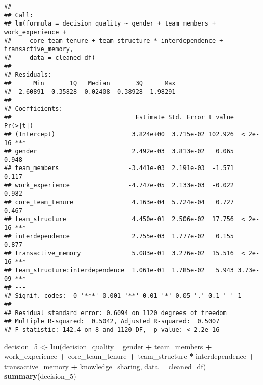 \documentclass[]{article}
\newenvironment{Shaded}{\begin{snugshade}}{\end{snugshade}}
\newcommand{\DataTypeTok}[1]{\textcolor[rgb]{0.13,0.29,0.53}{#1}}
\newcommand{\DecValTok}[1]{\textcolor[rgb]{0.00,0.00,0.81}{#1}}
\newcommand{\KeywordTok}[1]{\textcolor[rgb]{0.13,0.29,0.53}{\textbf{#1}}}
\newcommand{\NormalTok}[1]{#1}
\newcommand{\OperatorTok}[1]{\textcolor[rgb]{0.81,0.36,0.00}{\textbf{#1}}}
\newcommand{\StringTok}[1]{\textcolor[rgb]{0.31,0.60,0.02}{#1}}
\begin{document}
\begin{verbatim}
## 
## Call:
## lm(formula = decision_quality ~ gender + team_members + work_experience + 
##     core_team_tenure + team_structure * interdependence + transactive_memory, 
##     data = cleaned_df)
## 
## Residuals:
##      Min       1Q   Median       3Q      Max 
## -2.60891 -0.35828  0.02408  0.38928  1.98291 
## 
## Coefficients:
##                                  Estimate Std. Error t value Pr(>|t|)    
## (Intercept)                     3.824e+00  3.715e-02 102.926  < 2e-16 ***
## gender                          2.492e-03  3.813e-02   0.065    0.948    
## team_members                   -3.441e-03  2.191e-03  -1.571    0.117    
## work_experience                -4.747e-05  2.133e-03  -0.022    0.982    
## core_team_tenure                4.163e-04  5.724e-04   0.727    0.467    
## team_structure                  4.450e-01  2.506e-02  17.756  < 2e-16 ***
## interdependence                 2.755e-03  1.777e-02   0.155    0.877    
## transactive_memory              5.083e-01  3.276e-02  15.516  < 2e-16 ***
## team_structure:interdependence  1.061e-01  1.785e-02   5.943 3.73e-09 ***
## ---
## Signif. codes:  0 '***' 0.001 '**' 0.01 '*' 0.05 '.' 0.1 ' ' 1
## 
## Residual standard error: 0.6094 on 1120 degrees of freedom
## Multiple R-squared:  0.5042, Adjusted R-squared:  0.5007 
## F-statistic: 142.4 on 8 and 1120 DF,  p-value: < 2.2e-16
\end{verbatim}

\begin{Shaded}
\begin{Highlighting}[]
\NormalTok{decision_}\DecValTok{5}\NormalTok{ <-}\StringTok{ }\KeywordTok{lm}\NormalTok{(decision_quality }\OperatorTok{~}\StringTok{ }\NormalTok{gender }\OperatorTok{+}\StringTok{ }\NormalTok{team_members }\OperatorTok{+}\StringTok{ }\NormalTok{work_experience }\OperatorTok{+}\StringTok{ }\NormalTok{core_team_tenure }\OperatorTok{+}\StringTok{ }\NormalTok{team_structure }\OperatorTok{*}\StringTok{ }\NormalTok{interdependence }\OperatorTok{+}\StringTok{ }\NormalTok{transactive_memory }\OperatorTok{+}\StringTok{ }\NormalTok{knowledge_sharing, }\DataTypeTok{data =}\NormalTok{ cleaned_df)}
\KeywordTok{summary}\NormalTok{(decision_}\DecValTok{5}\NormalTok{)}
\end{Highlighting}
\end{Shaded}
\end{document}
